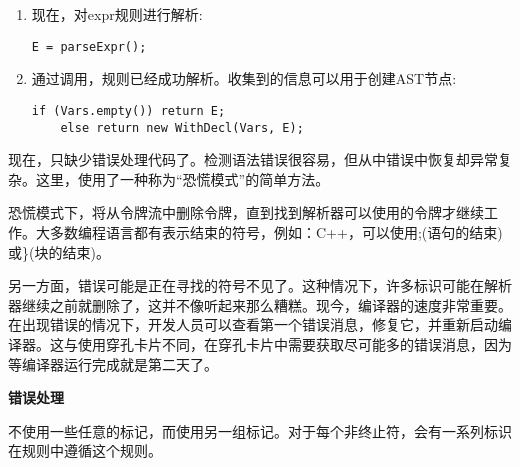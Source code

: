 \begin{enumerate}
\item 现在，对expr规则进行解析:
\begin{lstlisting}[caption={}]
	E = parseExpr();
\end{lstlisting}

\item 通过调用，规则已经成功解析。收集到的信息可以用于创建AST节点:
\begin{lstlisting}[caption={}]
	if (Vars.empty()) return E;
	else return new WithDecl(Vars, E);
\end{lstlisting}
\end{enumerate}

现在，只缺少错误处理代码了。检测语法错误很容易，但从中错误中恢复却异常复杂。这里，使用了一种称为“恐慌模式”的简单方法。\par

恐慌模式下，将从令牌流中删除令牌，直到找到解析器可以使用的令牌才继续工作。大多数编程语言都有表示结束的符号，例如：C++，可以使用;(语句的结束)或\}(块的结束)。\par

另一方面，错误可能是正在寻找的符号不见了。这种情况下，许多标识可能在解析器继续之前就删除了，这并不像听起来那么糟糕。现今，编译器的速度非常重要。在出现错误的情况下，开发人员可以查看第一个错误消息，修复它，并重新启动编译器。这与使用穿孔卡片不同，在穿孔卡片中需要获取尽可能多的错误消息，因为等编译器运行完成就是第二天了。\par

\hspace*{\fill} \par %
\textbf{错误处理}

不使用一些任意的标记，而使用另一组标记。对于每个非终止符，会有一系列标识在规则中遵循这个规则。\par

